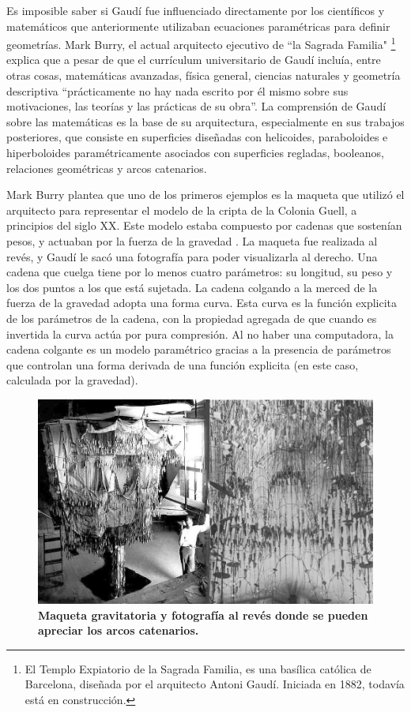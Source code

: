 Es imposible saber si Gaudí fue influenciado directamente por los científicos y matemáticos que anteriormente utilizaban ecuaciones paramétricas para definir geometrías. 
Mark Burry, el actual arquitecto ejecutivo de ``la Sagrada Familia" \footnote{El Templo Expiatorio de la Sagrada Familia, es una basílica católica de Barcelona, diseñada por el arquitecto Antoni Gaudí. Iniciada en 1882, todavía está en construcción.} explica que a pesar de que el currículum universitario de Gaudí incluía, entre otras cosas, matemáticas avanzadas, física general, ciencias naturales y geometría descriptiva ``prácticamente no hay nada escrito por él mismo sobre sus motivaciones, las teorías y las prácticas de su obra''. La comprensión de Gaudí sobre las matemáticas es la base de su arquitectura, especialmente en sus trabajos posteriores, que consiste en superficies diseñadas con helicoides, paraboloides e hiperboloides paramétricamente asociados con superficies regladas, booleanos, relaciones geométricas y arcos catenarios.

Mark Burry plantea que uno de los primeros ejemplos es la maqueta que utilizó el arquitecto para representar el modelo de la cripta de la Colonia Guell, a principios del siglo XX. Este modelo estaba compuesto por cadenas que sostenían pesos, y actuaban por la fuerza de la gravedad \citep{Kaled2016}.
La maqueta fue realizada al revés, y Gaudí le sacó una fotografía para poder visualizarla al derecho. Una cadena que cuelga tiene por lo menos cuatro parámetros: su longitud, su peso y los dos puntos a los que está sujetada. La cadena colgando a la merced de la fuerza de la gravedad adopta una forma curva. Esta curva es la función explicita de los parámetros de la cadena, con la propiedad agregada de que cuando es invertida la curva actúa por pura compresión. Al no haber una computadora, la cadena colgante es un modelo paramétrico gracias a la presencia de parámetros que controlan una forma derivada de una función explicita (en este caso, calculada por la gravedad). 


\begin{figure}[h]
\includegraphics[width=12cm]{Img/GEO/geo-gaudic.jpg}
\centering
\caption{\textbf{\footnotesize{Maqueta gravitatoria y fotografía al revés donde se pueden apreciar los arcos catenarios.}}}
\label{fig:gaudi}
\end{figure}




